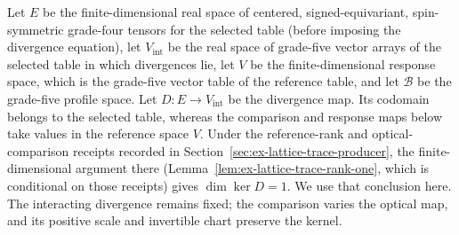 Let $E$ be the finite-dimensional real space of centered, signed-equivariant,
spin-symmetric grade-four tensors for the selected table (before imposing
the divergence equation), let $V_{\mathrm{int}}$ be the real space of
grade-five vector arrays of the selected table in which divergences lie,
let $V$ be the finite-dimensional response space, which is the grade-five
vector table of the reference table, and let $\mathcal B$ be the
grade-five profile space. Let
$D:E\to V_{\mathrm{int}}$ be the divergence map. Its codomain belongs to
the selected table, whereas the comparison and response maps below take
values in the reference space $V$. Under the reference-rank and optical-comparison receipts
recorded in Section~\ref{sec:ex-lattice-trace-producer}, the finite-dimensional
argument there (Lemma~\ref{lem:ex-lattice-trace-rank-one}, which is
conditional on those receipts) gives $\dim\ker D=1$. We use that conclusion here. The
interacting divergence remains fixed; the comparison varies the optical map,
and its positive scale and invertible chart preserve the kernel.

